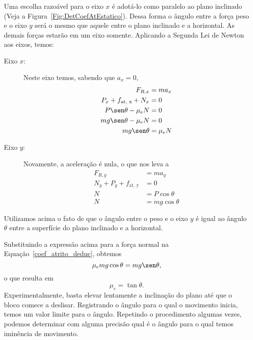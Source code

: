 Uma escolha razoável para o eixo $x$ é adotá-lo como paralelo ao plano inclinado (Veja a Figura~\ref{Fig:DetCoefAtEstatico}). Dessa forma o ângulo entre a força peso e o eixo $y$ será o mesmo que aquele entre o plano inclinado e a horizontal. As demais forças estarão em um eixo somente. Aplicando a Segunda Lei de Newton aos eixos, temos:
\begin{description}
    \item[Eixo $x$:] Neste eixo temos, sabendo que $a_x = 0$,
        \begin{align}
            F_{R, x} &= m a_x \\
            P_x + f_{\text{at, x}} + N_x &= 0 \\
            P \sen\theta - \mu_e N &= 0 \\
            mg \sen\theta - \mu_e N &= 0 \\
            mg \sen\theta &= \mu_e N \label{coef_atrito_deduc}
        \end{align}
    \item[Eixo $y$:] Novamente, a aceleração é nula, o que nos leva a
        \begin{align}
            F_{R, y} &= m a_y \\
            N_y + P_y + f_{\text{at, y}} &= 0 \\
            N &= P\cos\theta \\
            N &= mg \cos\theta
        \end{align}
\end{description}
%
Utilizamos acima o fato de que o ângulo entre o peso e o eixo $y$ é igual ao ângulo $\theta$ entre a superfície do plano inclinado e a horizontal.

Substituindo a expressão acima para a força normal na Equação~\eqref{coef_atrito_deduc}, obtemos
\begin{equation}
    \mu_e mg \cos\theta = mg \sen\theta,
\end{equation}
%
o que resulta em
\begin{equation}\label{Eq:CoefAtritoEstaticoMaxTanTheta}
    \mu_e = \tan\theta.
\end{equation}
%
Experimentalmente, basta elevar lentamente a inclinação do plano até que o bloco comece a deslisar. Registrando o ângulo para o qual o movimento inicia, temos um valor limite para o ângulo. Repetindo o procedimento algumas vezes, podemos determinar com alguma precisão qual é o ângulo para o qual temos iminência de movimento.

